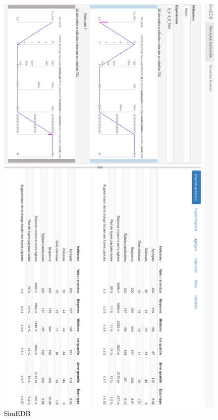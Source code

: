 	\begin{figure}[H]
		\centering
		\includegraphics[width=.85\linewidth]{img/SimEDB_nombreFP_villages_rotate_cut.png}
		\caption{SimEDB }
		\label{fig:simedb_villages}
	\end{figure}
\clearpage

